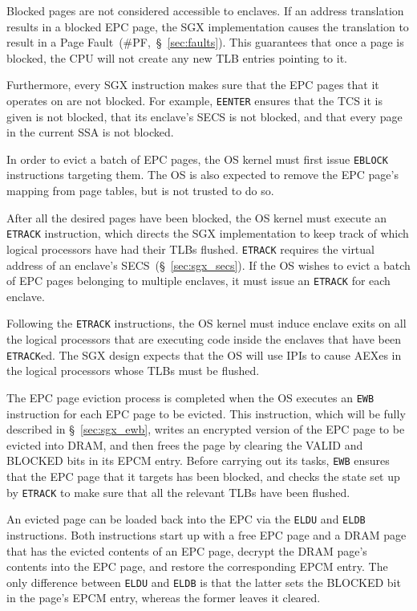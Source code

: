 Blocked pages are not considered accessible to enclaves. If an address
translation results in a blocked EPC page, the SGX implementation causes the
translation to result in a Page Fault~(\#PF,~\S~\ref{sec:faults}). This
guarantees that once a page is blocked, the CPU will not create any new TLB
entries pointing to it.

Furthermore, every SGX instruction makes sure that the EPC pages that it
operates on are not blocked. For example, \texttt{EENTER} ensures that the TCS
it is given is not blocked, that its enclave's SECS is not blocked, and that
every page in the current SSA is not blocked.


In order to evict a batch of EPC pages, the OS kernel must first issue
\texttt{EBLOCK} instructions targeting them. The OS is also expected to remove
the EPC page's mapping from page tables, but is not trusted to do so.

After all the desired pages have been blocked, the OS kernel must execute an
\texttt{ETRACK} instruction, which directs the SGX implementation to keep track
of which logical processors have had their TLBs flushed. \texttt{ETRACK}
requires the virtual address of an enclave's SECS~(\S~\ref{sec:sgx_secs}). If
the OS wishes to evict a batch of EPC pages belonging to multiple enclaves, it
must issue an \texttt{ETRACK} for each enclave.

Following the \texttt{ETRACK} instructions, the OS kernel must induce enclave
exits on all the logical processors that are executing code inside the enclaves
that have been \texttt{ETRACK}ed. The SGX design expects that the OS will use
IPIs to cause AEXes in the logical processors whose TLBs must be flushed.

The EPC page eviction process is completed when the OS executes an \texttt{EWB}
instruction for each EPC page to be evicted. This instruction, which will be
fully described in \S~\ref{sec:sgx_ewb}, writes an encrypted version of the EPC
page to be evicted into DRAM, and then frees the page by clearing the VALID and
BLOCKED bits in its EPCM entry. Before carrying out its tasks, \texttt{EWB}
ensures that the EPC page that it targets has been blocked, and checks the
state set up by \texttt{ETRACK} to make sure that all the relevant TLBs have
been flushed.

An evicted page can be loaded back into the EPC via the \texttt{ELDU} and
\texttt{ELDB} instructions. Both instructions start up with a free EPC page and
a DRAM page that has the evicted contents of an EPC page, decrypt the DRAM
page's contents into the EPC page, and restore the corresponding EPCM entry.
The only difference between \texttt{ELDU} and \texttt{ELDB} is that the latter
sets the BLOCKED bit in the page's EPCM entry, whereas the former leaves it
cleared.

